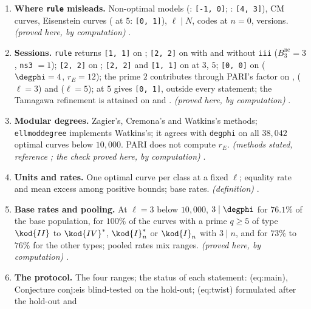 \begin{enumerate}[label=\textbf{\thechapter.\arabic*}]
{)} .
\item \textbf{Where \texttt{rule} misleads.} Non-optimal models (: \texttt{[-1, 0]}; : \texttt{[4, 3]}), CM curves, Eisenstein curves ( at $5$:
\texttt{[0, 1]}), $\ell\mid N$, codes at $n=0$, versions. \emph{(proved here, by computation)} .
\item \textbf{Sessions.} \texttt{rule} returns \texttt{[1, 1]} on ; \texttt{[2, 2]} on  with and without \texttt{iii} ($B^{\mathrm{nc}}_3=3$, \texttt{ns3} $=1$); \texttt{[2, 2]} on
; \texttt{[2, 2]} and \texttt{[1, 1]} on  at $3$, $5$; \texttt{[0, 0]} on  ($\degphi=4$, $r_E=12$); the prime $2$ contributes through PARI's factor on
,  ($\ell=3$) and  ($\ell=5$);  at $5$ gives \texttt{[0, 1]}, outside every statement; the Tamagawa refinement is attained on
 and . \emph{(proved here, by computation)}
.
\item \textbf{Modular degrees.} Zagier's, Cremona's and Watkins's methods; \texttt{ellmoddegree} implements Watkins's; it agrees with \texttt{degphi} on all $38{,}042$ optimal
curves below $10{,}000$. PARI does not compute $r_E$. \emph{(methods stated, reference \cite{Watkins02,Cremona97}; the check proved here, by computation)}
.
\item \textbf{Units and rates.} One optimal curve per class at a fixed $\ell$; equality rate and mean excess among positive bounds; base rates. \emph{(definition)}
.
\item \textbf{Base rates and pooling.} At $\ell=3$ below $10{,}000$, $3\mid\degphi$ for $76.1\%$ of the base population, for $100\%$ of the curves with a prime $q\ge5$ of type
$\kod{II}$ to $\kod{IV}^*$, $\kod{I}_n^*$ or $\kod{I}_n$ with $3\mid n$, and for $73\%$ to $76\%$ for the other types; pooled rates mix ranges. \emph{(proved here, by computation)}
.
\item \textbf{The protocol.} The four ranges; the status of each statement: (eq:main), Conjecture conj:eis blind-tested on the hold-out; (eq:twist) formulated after the hold-out and

\end{enumerate}
